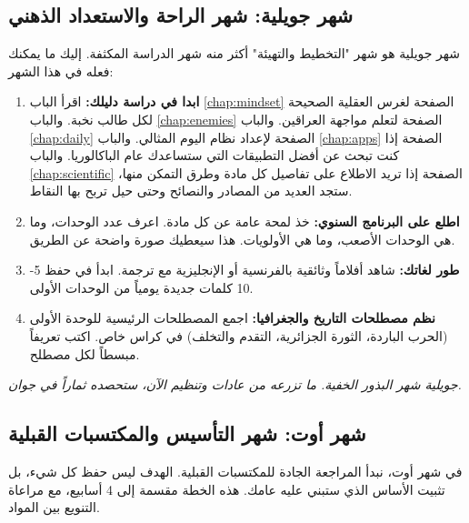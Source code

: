 \documentclass[12pt,a4paper]{book}
\newcommand{\quoteAr}[1]{%
	\begin{myquote}
		\itshape #1
	\end{myquote}
}
\begin{document}
	\subsection{شهر جويلية: شهر الراحة والاستعداد الذهني}
	
	شهر جويلية هو شهر "التخطيط والتهيئة" أكثر منه شهر الدراسة المكثفة. إليك ما يمكنك فعله في هذا الشهر:
	

	
	\begin{enumerate}
		\item \textbf{ابدا في دراسة دليلك:} 	اقرأ الباب  \ref{chap:mindset} الصفحة \pageref{chap:mindset} لغرس العقلية الصحيحة لكل طالب نخبة. والباب  \ref{chap:enemies} الصفحة \pageref{chap:enemies}  لتعلم مواجهة العراقين. والباب  \ref{chap:daily} الصفحة \pageref{chap:daily} لإعداد نظام اليوم المثالي. والباب  \ref{chap:apps} الصفحة \pageref{chap:apps} إذا كنت تبحث عن أفضل التطبيقات التي ستساعدك عام الباكالوريا. والباب  \ref{chap:scientific} الصفحة \pageref{chap:scientific} إذا تريد الاطلاع على تفاصيل كل مادة وطرق التمكن منها، ستجد العديد من المصادر والنصائح وحتى حيل تربح بها النقاط.
		
		\item \textbf{اطلع على البرنامج السنوي:} خذ لمحة عامة عن كل مادة. اعرف عدد الوحدات، وما هي الوحدات الأصعب، وما هي الأولويات. هذا سيعطيك صورة واضحة عن الطريق.
		\item \textbf{طور لغاتك:} شاهد أفلاماً وثائقية بالفرنسية أو الإنجليزية مع ترجمة. ابدأ في حفظ 5-10 كلمات جديدة يومياً من الوحدات الأولى.
		\item \textbf{نظم مصطلحات التاريخ والجغرافيا:} اجمع المصطلحات الرئيسية للوحدة الأولى (الحرب الباردة، الثورة الجزائرية، التقدم والتخلف) في كراس خاص. اكتب تعريفاً مبسطاً لكل مصطلح.
	\end{enumerate}
	
	\quoteAr{جويلية شهر البذور الخفية. ما تزرعه من عادات وتنظيم الآن، ستحصده ثماراً في جوان.}
	
	\subsection{شهر أوت: شهر التأسيس والمكتسبات القبلية}
	
	في شهر أوت، نبدأ المراجعة الجادة للمكتسبات القبلية. الهدف ليس حفظ كل شيء، بل تثبيت الأساس الذي ستبني عليه عامك. هذه الخطة مقسمة إلى 4 أسابيع، مع مراعاة التنويع بين المواد.
	
\end{document}
